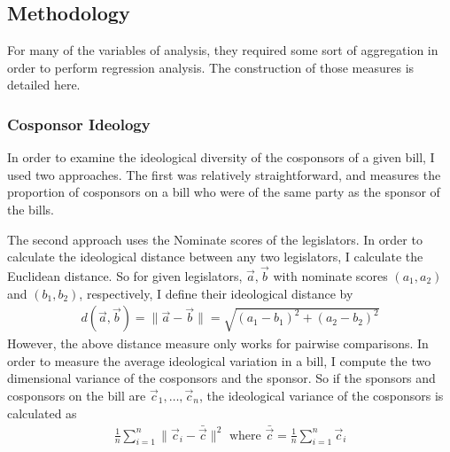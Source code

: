\documentclass{article}
\begin{document}
\subsection{Methodology}
For many of the variables of analysis, they required some sort of aggregation in order to perform regression analysis. The construction of those measures is detailed here. 

\subsubsection{Cosponsor Ideology}
In order to examine the ideological diversity of the cosponsors of a given bill, I used two approaches. The first was relatively straightforward, and measures the proportion of cosponsors on a bill who were of the same party as the sponsor of the bills. 

The second approach uses the Nominate scores of the legislators. In order to calculate the ideological distance between any two legislators, I calculate the Euclidean distance. So for given legislators, $\vec{a}, \vec{b}$ with nominate scores $(a_1, a_2)$ and $(b_1, b_2)$, respectively, I define their ideological distance by
\begin{align*}
    d(\vec{a}, \vec{b}) = \|\vec{a} - \vec{b}\| = \sqrt{(a_1 - b_1)^2 + (a_2 - b_2)^2}
\end{align*}
However, the above distance measure only works for pairwise comparisons. In order to measure the average ideological variation in a bill, I compute the two dimensional variance of the cosponsors and the sponsor. So if the sponsors and cosponsors on the bill are $\vec{c}_1, \dots, \vec{c}_n$, the ideological variance of the cosponsors is calculated as
\begin{align*}
    \frac{1}{n} \sum_{i = 1}^n \|\vec{c}_i - \bar{\vec{c}}\|^2 \text{ where } \bar{\vec{c}} = \frac{1}{n} \sum_{i = 1}^n \vec{c}_i
\end{align*}
\end{document}
